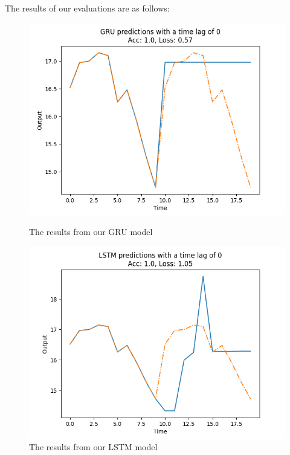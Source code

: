 \documentclass{article}
\begin{document}
    The results of our evaluations are as follows:

    \begin{figure}[H]
        \begin{minipage}{0.49\textwidth}
            \centering
            \includegraphics[width=\linewidth]{../../img/gruEval}
            \caption{The results from our GRU model}\label{Fig:gruEval}
        \end{minipage}\hfill
        \begin{minipage}{0.49\textwidth}
            \centering
            \includegraphics[width=\linewidth]{../../img/lstmEval}
            \caption{The results from our LSTM model}\label{Fig:lstmEval}
        \end{minipage}
    \end{figure}
\end{document}
